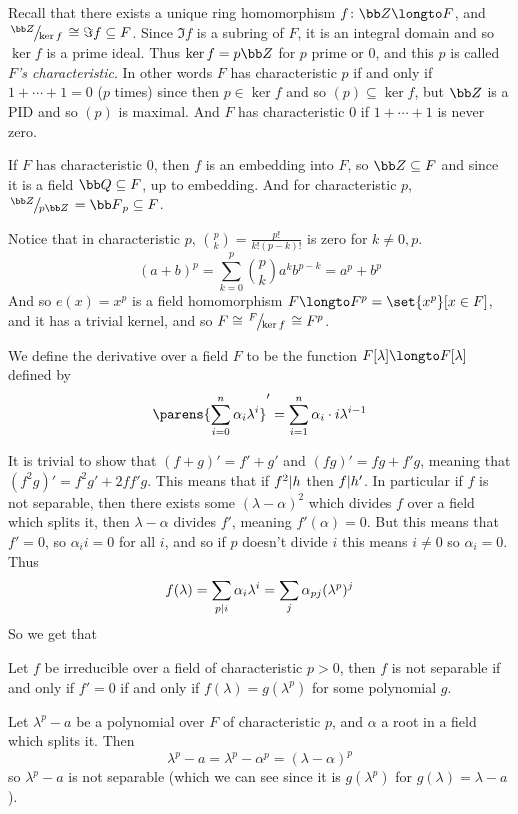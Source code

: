 Recall that there exists a unique ring homomorphism $f\colon{\bb Z}\longto F$, and $\slfrac{{\bb Z}}{\ker f}\cong\Im f\subseteq F$.
Since $\Im f$ is a subring of $F$, it is an integral domain and so $\ker f$ is a prime ideal.
Thus $\ker f=p{\bb Z}$ for $p$ prime or $0$, and this $p$ is called {\it $F$'s characteristic}.
In other words $F$ has characteristic $p$ if and only if $1+\cdots+1=0$ ($p$ times) since then $p\in\ker f$ and so $(p)\subseteq\ker f$, but ${\bb Z}$ is a PID and so $(p)$ is maximal.
And $F$ has characteristic $0$ if $1+\cdots+1$ is never zero.

If $F$ has characteristic $0$, then $f$ is an embedding into $F$, so ${\bb Z}\subseteq F$ and since it is a field ${\bb Q}\subseteq F$, up to embedding.
And for characteristic $p$, $\slfrac{{\bb Z}}{p{\bb Z}}={\bb F}_p\subseteq F$.

Notice that in characteristic $p$, $\binom pk=\frac{p!}{k!(p-k)!}$ is zero for $k\neq0,p$.
$$ (a+b)^p = \sum_{k=0}^p\binom pka^kb^{p-k} = a^p + b^p $$
And so $e(x)=x^p$ is a field homomorphism $F\longto F^p=\set{x^p}[x\in F]$, and it has a trivial kernel, and so $F\cong\slfrac F{\ker f}\cong F^p$.

\bdefn

    We define the {\emphcolor derivative} over a field $F$ to be the function $F[\lambda]\longto F[\lambda]$ defined by
    $$ \parens{\sum_{i=0}^n\alpha_i\lambda^i}' = \sum_{i=1}^n\alpha_i\cdot i\lambda^{i-1} $$

\edefn

It is trivial to show that $(f+g)'=f'+g'$ and $(fg)'=fg+f'g$, meaning that $(f^2g)'=f^2g'+2ff'g$.
This means that if $f^2{\mid} h$ then $f{\mid} h'$.
In particular if $f$ is not separable, then there exists some $(\lambda-\alpha)^2$ which divides $f$ over a field which splits it, then $\lambda-\alpha$ divides $f'$, meaning $f'(\alpha)=0$.
But this means that $f'=0$, so $\alpha_ii=0$ for all $i$, and so if $p$ doesn't divide $i$ this means $i\neq0$ so $\alpha_i=0$.
Thus
$$ f(\lambda) = \sum_{p{\mid} i}\alpha_i\lambda^i = \sum_j\alpha_{pj}(\lambda^p)^j $$
So we get that

\bprop

    Let $f$ be irreducible over a field of characteristic $p>0$, then $f$ is not separable if and only if $f'=0$ if and only if $f(\lambda)=g(\lambda^p)$ for some polynomial $g$.

\eprop

\bexam

    Let $\lambda^p-a$ be a polynomial over $F$ of characteristic $p$, and $\alpha$ a root in a field which splits it.
    Then
    $$ \lambda^p-a = \lambda^p-\alpha^p = (\lambda-\alpha)^p $$
    so $\lambda^p-a$ is not separable (which we can see since it is $g(\lambda^p)$ for $g(\lambda)=\lambda-a$).

